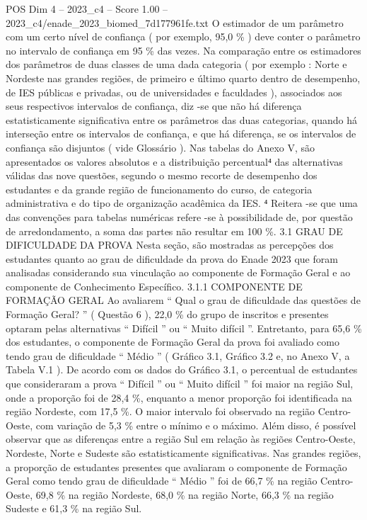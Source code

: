 \begin{textsample}{POS Dim 4 – 2023\_c4 – Score 1.00 – 2023\_c4/enade\_2023\_biomed\_7d177961fe.txt}
O estimador de um parâmetro com um certo nível de confiança ( por exemplo, 95,0 \% ) deve conter o parâmetro no intervalo de confiança em 95 \% das vezes.
Na comparação entre os estimadores dos parâmetros de duas classes de uma dada categoria ( por exemplo : Norte e Nordeste nas grandes regiões, de primeiro e último quarto dentro de desempenho, de IES públicas e privadas, ou de universidades e faculdades ), associados aos seus respectivos intervalos de confiança, diz -se que não há diferença estatisticamente significativa entre os parâmetros das duas categorias, quando há interseção entre os intervalos de confiança, e que há diferença, se os intervalos de confiança são disjuntos ( vide Glossário ).
Nas tabelas do Anexo V, são apresentados os valores absolutos e a distribuição percentual⁴ das alternativas válidas das nove questões, segundo o mesmo recorte de desempenho dos estudantes e da grande região de funcionamento do curso, de categoria administrativa e do tipo de organização acadêmica da IES. ⁴ Reitera -se que uma das convenções para tabelas numéricas refere -se à possibilidade de, por questão de arredondamento, a soma das partes não resultar em 100 \%. 3.1 GRAU DE DIFICULDADE DA PROVA Nesta seção, são mostradas as percepções dos estudantes quanto ao grau de dificuldade da prova do Enade 2023 que foram analisadas considerando sua vinculação ao componente de Formação Geral e ao componente de Conhecimento Específico. 3.1.1 COMPONENTE DE FORMAÇÃO GERAL Ao avaliarem “ Qual o grau de dificuldade das questões de Formação Geral? ” ( Questão 6 ), 22,0 \% do grupo de inscritos e presentes optaram pelas alternativas “ Difícil ” ou “ Muito difícil ”.
Entretanto, para 65,6 \% dos estudantes, o componente de Formação Geral da prova foi avaliado como tendo grau de dificuldade “ Médio ” ( Gráfico 3.1, Gráfico 3.2 e, no Anexo V, a Tabela V.1 ).
De acordo com os dados do Gráfico 3.1, o percentual de estudantes que consideraram a prova “ Difícil ” ou “ Muito difícil ” foi maior na região Sul, onde a proporção foi de 28,4 \%, enquanto a menor proporção foi identificada na região Nordeste, com 17,5 \%.
O maior intervalo foi observado na região Centro-Oeste, com variação de 5,3 \% entre o mínimo e o máximo.
Além disso, é possível observar que as diferenças entre a região Sul em relação às regiões Centro-Oeste, Nordeste, Norte e Sudeste são estatisticamente significativas.
Nas grandes regiões, a proporção de estudantes presentes que avaliaram o componente de Formação Geral como tendo grau de dificuldade “ Médio ” foi de 66,7 \% na região Centro-Oeste, 69,8 \% na região Nordeste, 68,0 \% na região Norte, 66,3 \% na região Sudeste e 61,3 \% na região Sul.

\end{textsample}
